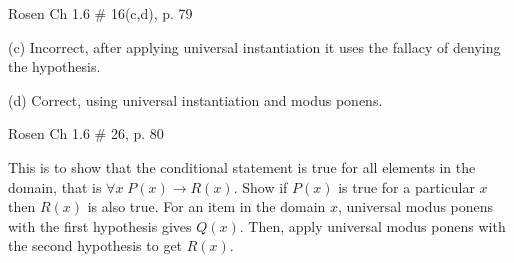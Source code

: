 \documentclass[12pt,addpoints]{exam}
\newcommand{\ra}{\rightarrow}
\newenvironment{my_item}{
\begin{itemize}
    \setlength{\itemsep}{1pt}
    \setlength{\parskip}{0pt}
    \setlength{\parsep}{0pt}
}{\end{itemize}}
\begin{document}
\begin{questions}
\question Rosen Ch 1.6 \# 16(c,d), p. 79

    \begin{solution}
    \begin{my_item}
        \item[(c)] Incorrect, after applying universal instantiation it uses the fallacy of denying the hypothesis.
        \item[(d)] Correct, using universal instantiation and modus ponens.
    \end{my_item}
    \end{solution}

\question Rosen Ch 1.6 \# 26, p. 80

    \begin{solution}
    This is to show that the conditional statement is true for all elements in the domain, that is $\forall x\; P(x) \ra R(x)$.  Show if $P(x)$ is true for a particular $x$ then $R(x)$ is also true.  For an item in the domain $x$, universal modus ponens with the first hypothesis gives $Q(x)$.  Then, apply universal modus ponens with the second hypothesis to get $R(x)$.
    \end{solution}


\end{questions}
\end{document}
